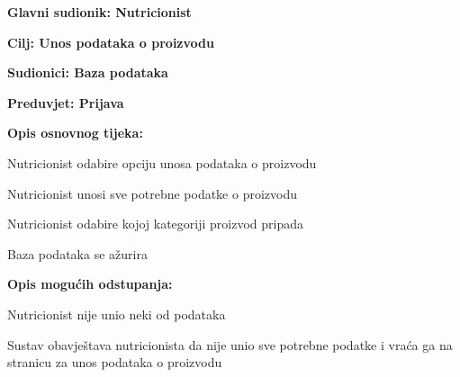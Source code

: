 					
				\noindent {}
					\begin{packed_item}
	
						\item \textbf{Glavni sudionik: Nutricionist}
						\item  \textbf{Cilj: Unos podataka o proizvodu }
						\item  \textbf{Sudionici: Baza podataka}
						\item  \textbf{Preduvjet: Prijava } 
						\item  \textbf{Opis osnovnog tijeka:}
						
						\item[] \begin{packed_enum}
	
							\item Nutricionist odabire opciju unosa podataka o proizvodu
							\item Nutricionist unosi sve potrebne podatke o proizvodu
							\item Nutricionist odabire kojoj kategoriji proizvod pripada
							\item Baza podataka se ažurira
						\end{packed_enum}

					\item  \textbf{Opis mogućih odstupanja:}
						
						\item[] \begin{packed_item}
	
							\item[2.a] Nutricionist nije unio neki od podataka
							\item[] \begin{packed_enum}
								
								\item Sustav obavještava nutricionista da nije unio sve potrebne podatke i vraća ga na stranicu za unos podataka o proizvodu
							\end{packed_enum}
						\end{packed_item}
					\end{packed_item}
					
